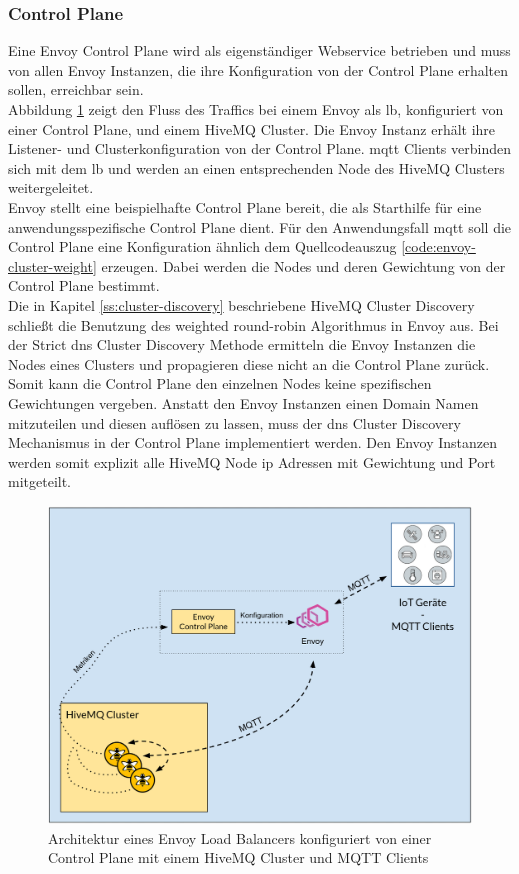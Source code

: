 \subsubsection{Control Plane} \label{ss:control-plane}
Eine Envoy Control Plane wird als eigenständiger Webservice betrieben und muss von allen Envoy Instanzen, die ihre Konfiguration von der Control Plane erhalten sollen, erreichbar sein.
\\
Abbildung \ref{fig:control-plane-architecture} zeigt den Fluss des Traffics bei einem Envoy als \acl{lb}, konfiguriert von einer Control Plane, und einem HiveMQ Cluster. Die Envoy Instanz erhält ihre Listener- und Clusterkonfiguration von der Control Plane. \ac{mqtt} Clients verbinden sich mit dem \ac{lb} und werden an einen entsprechenden Node des HiveMQ Clusters weitergeleitet.
\\
Envoy stellt eine beispielhafte Control Plane \cite{DynamicConfigurationControl} bereit, die als Starthilfe für eine anwendungsspezifische Control Plane dient. Für den Anwendungsfall \ac{mqtt} soll die Control Plane eine Konfiguration ähnlich dem Quellcodeauszug \ref{code:envoy-cluster-weight} erzeugen. Dabei werden die Nodes und deren Gewichtung von der Control Plane bestimmt.
\\
Die in Kapitel \ref{ss:cluster-discovery} beschriebene HiveMQ Cluster Discovery schlie{\ss}t die Benutzung des weighted round-robin Algorithmus in Envoy aus.
Bei der Strict \ac{dns} Cluster Discovery Methode ermitteln die Envoy Instanzen die Nodes eines Clusters und propagieren diese nicht an die Control Plane zurück. Somit kann die Control Plane den einzelnen Nodes keine spezifischen Gewichtungen vergeben.
Anstatt den Envoy Instanzen einen Domain Namen mitzuteilen und diesen auflösen zu lassen, muss der \ac{dns} Cluster Discovery Mechanismus in der Control Plane implementiert werden. Den Envoy Instanzen werden somit explizit alle HiveMQ Node \ac{ip} Adressen mit Gewichtung und Port mitgeteilt.
\begin{figure}
    \centering
    \includegraphics[scale=0.36]{images/control-plane-architecture.png}
    \caption{Architektur eines Envoy Load Balancers konfiguriert von einer Control Plane mit einem HiveMQ Cluster und MQTT Clients}
    \label{fig:control-plane-architecture}
\end{figure}

